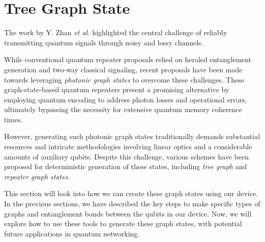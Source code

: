 \section{Tree Graph State}
\label{chap:tree_graph_state}
\thispagestyle{fancy}

The work by Y. Zhan \emph{et al.} \cite{tree_graph_state} highlighted the central challenge of reliably transmitting quantum signals through noisy and lossy channels.

While conventional quantum repeater proposals relied on heraled entanglement generation and two-way classical signaling, recent proposals have been made towards leveraging \emph{photonic graph states} to overcome these challenges.
These graph-state-based quantum repeaters \cite{One_way_quantum_repeaters} present a promising alternative by employing quantum encoding to address photon losses and operational errors, ultimately bypassing the necessity for extensive quantum memory coherence times.

However, generating such photonic graph states traditionally demands substantial resources and intricate methodologies involving linear optics and a considerable amounts of auxiliary qubits.
Despite this challenge, various schemes have been proposed for deterministic generation of these states, including \emph{tree graph} and \emph{repeater graph states}.

This section will look into how we can create these graph states using our device. 
In the previous sections, we have described the key steps to make specific types of graphs and entanglement bonds between the qubits in our device.
Now, we will explore how to use these tools to generate these graph states, with potential future applications in quantum networking.



